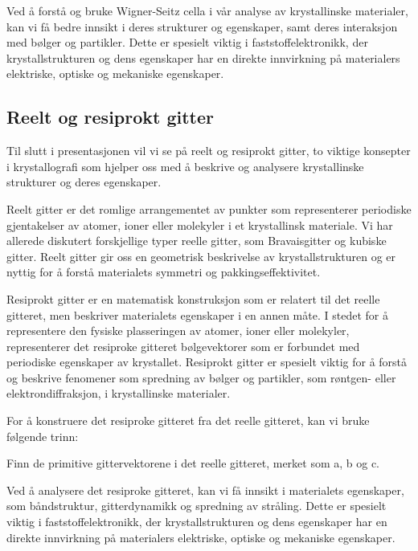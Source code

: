 Ved å forstå og bruke Wigner-Seitz cella i vår analyse av krystallinske materialer, kan vi få bedre innsikt i deres strukturer og egenskaper, samt deres interaksjon med bølger og partikler. Dette er spesielt viktig i faststoffelektronikk, der krystallstrukturen og dens egenskaper har en direkte innvirkning på materialers elektriske, optiske og mekaniske egenskaper.

\subsection*{Reelt og resiprokt gitter}
Til slutt i presentasjonen vil vi se på reelt og resiprokt gitter, to viktige konsepter i krystallografi som hjelper oss med å beskrive og analysere krystallinske strukturer og deres egenskaper.

Reelt gitter er det romlige arrangementet av punkter som representerer periodiske gjentakelser av atomer, ioner eller molekyler i et krystallinsk materiale. Vi har allerede diskutert forskjellige typer reelle gitter, som Bravaisgitter og kubiske gitter. Reelt gitter gir oss en geometrisk beskrivelse av krystallstrukturen og er nyttig for å forstå materialets symmetri og pakkingseffektivitet.

Resiprokt gitter er en matematisk konstruksjon som er relatert til det reelle gitteret, men beskriver materialets egenskaper i en annen måte. I stedet for å representere den fysiske plasseringen av atomer, ioner eller molekyler, representerer det resiproke gitteret bølgevektorer som er forbundet med periodiske egenskaper av krystallet. Resiprokt gitter er spesielt viktig for å forstå og beskrive fenomener som spredning av bølger og partikler, som røntgen- eller elektrondiffraksjon, i krystallinske materialer.

For å konstruere det resiproke gitteret fra det reelle gitteret, kan vi bruke følgende trinn:

Finn de primitive gittervektorene i det reelle gitteret, merket som a, b og c.

Ved å analysere det resiproke gitteret, kan vi få innsikt i materialets egenskaper, som båndstruktur, gitterdynamikk og spredning av stråling. Dette er spesielt viktig i faststoffelektronikk, der krystallstrukturen og dens egenskaper har en direkte innvirkning på materialers elektriske, optiske og mekaniske egenskaper.